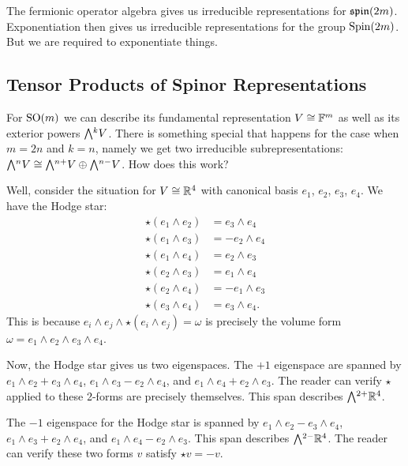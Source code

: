 \M
The fermionic operator algebra gives us irreducible representations for
$\operatorname{\mathfrak{spin}}(2m)$. Exponentiation then gives us irreducible representations
for the group $\operatorname{Spin}(2m)$. But we are required to exponentiate things.

\subsection{Tensor Products of Spinor Representations}

For $\operatorname{SO}(m)$ we can describe its fundamental representation
$V\cong\mathbb{F}^{m}$ as well as its exterior powers $\Exterior^{k}V$. There is
something special that happens for the case when $m=2n$ and $k=n$,
namely we get two irreducible subrepresentations:
$\Exterior^{n}V\iso\Exterior^{n+}V\oplus\Exterior^{n-}V$.
How does this work?

Well, consider the situation for $V\cong\mathbb{R}^{4}$ with canonical basis
$e_{1}$, $e_{2}$, $e_{3}$, $e_{4}$. We have the Hodge star:
\begin{subequations}
\begin{align}
\star(e_{1}\wedge e_{2}) &= e_{3}\wedge e_{4}\\
\star(e_{1}\wedge e_{3}) &= -e_{2}\wedge e_{4}\\
\star(e_{1}\wedge e_{4}) &= e_{2}\wedge e_{3}\\
\star(e_{2}\wedge e_{3}) &= e_{1}\wedge e_{4}\\
\star(e_{2}\wedge e_{4}) &= -e_{1}\wedge e_{3}\\
\star(e_{3}\wedge e_{4}) &= e_{3}\wedge e_{4}.
\end{align}
\end{subequations}
This is because $e_{i}\wedge e_{j}\wedge\star(e_{i}\wedge e_{j})=\omega$
is precisely the volume form $\omega = e_{1}\wedge e_{2}\wedge e_{3}\wedge e_{4}$.

Now, the Hodge star gives us two eigenspaces. The $+1$ eigenspace are
spanned by $e_{1}\wedge e_{2} + e_{3}\wedge e_{4}$,
$e_{1}\wedge e_{3} -e_{2}\wedge e_{4}$,
and $e_{1}\wedge e_{4} + e_{2}\wedge e_{3}$.
The reader can verify $\star$ applied to these 2-forms are precisely
themselves. This span describes $\Exterior^{2+}\RR^{4}$.

The $-1$ eigenspace for the Hodge star is spanned by
$e_{1}\wedge e_{2} - e_{3}\wedge e_{4}$,
$e_{1}\wedge e_{3} + e_{2}\wedge e_{4}$, and
$e_{1}\wedge e_{4} - e_{2}\wedge e_{3}$. This span describes
$\Exterior^{2-}\RR^{4}$. The reader can verify these two forms $v$
satisfy $\star v = - v$.

